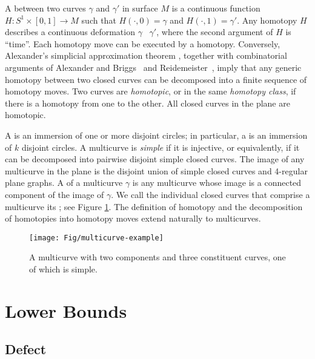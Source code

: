 \documentclass[11pt,twoside]{article}
\let\EDIT\relax
\numberwithin{figure}{section}
\begin{document}
A  between two curves $\gamma$ and $\gamma'$ in surface $M$ is a continuous function $H\colon {S^1 \times [0,1] \to M}$ such that $H(\cdot,0) = \gamma$ and $H(\cdot,1) = \gamma'$.  Any homotopy $H$ describes a continuous deformation \EDIT{from} $\gamma$ \EDIT{to}~$\gamma'$, where the second argument of $H$ is “time”.  Each homotopy move can be executed by a homotopy. Conversely, Alexander's simplicial approximation theorem \cite{a-cas-26}, together with combinatorial arguments of Alexander and Briggs~\cite{ab-tkc-26} and Reidemeister~\cite{r-ebk-27}, imply that any generic homotopy between two closed curves can be decomposed into a finite sequence of homotopy moves. Two curves are \emph{homotopic}, or in the same \emph{homotopy class}, if there is a homotopy from one to the other. All closed curves in the plane are homotopic.

A  is an immersion of one or more disjoint circles; in particular, a  is an immersion of $k$ disjoint circles.  A multicurve is \emph{simple} if it is injective, or equivalently, if it can be decomposed into pairwise disjoint simple closed curves.  The image of any multicurve in the plane is the disjoint union of simple closed curves and 4-regular plane graphs.   A  of a multicurve $\gamma$ is any multicurve whose image is a connected component of the image of $\gamma$.  We call the individual closed curves that comprise a multicurve its \EMPH{constituent \EDIT{curves}}; see Figure \ref{F:components}.  The definition of homotopy and the decomposition of homotopies into homotopy moves extend naturally to multicurves.  

\begin{figure}[ht]
\centering
\texttt{[image: Fig/multicurve-example]}
\caption{A multicurve with two components and three constituent curves, one of which is simple.}
\label{F:components}
\end{figure}


\section{Lower Bounds}
\label{S:lower-bound}

\subsection{Defect}
\label{SS:defect}
\end{document}

